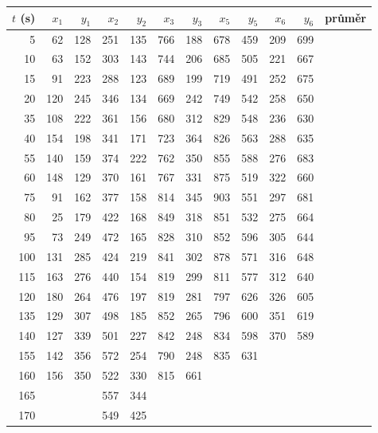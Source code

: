 \documentclass[a4paper,11pt]{article}
\begin{document}
\begin{table}[htpb]
    \centering
    \scriptsize
    \begin{tabular}{c | r r | r r | r r | r r | r r | c}
        \multicolumn{1}{r|}{$ t $ (s)} & $ x_1 $ & $ y_1 $ & $ x_2 $ & $ y_2 $ & $ x_3 $ & $ y_3 $ & $ x_5 $ & $ y_5 $ & $ x_6 $ & $ y_6 $ & průměr  \\
        \hline\hline
       \multicolumn{1}{r|}{  5} & 62  & 128 & 251 & 135 & 766 & 188 & 678 & 459 & 209 & 699 &  \\
       \multicolumn{1}{r|}{ 10} & 63  & 152 & 303 & 143 & 744 & 206 & 685 & 505 & 221 & 667 &  \\
       \multicolumn{1}{r|}{ 15} & 91  & 223 & 288 & 123 & 689 & 199 & 719 & 491 & 252 & 675 &  \\
       \multicolumn{1}{r|}{ 20} & 120 & 245 & 346 & 134 & 669 & 242 & 749 & 542 & 258 & 650 &  \\
       \multicolumn{1}{r|}{ 35} & 108 & 222 & 361 & 156 & 680 & 312 & 829 & 548 & 236 & 630 &  \\
       \multicolumn{1}{r|}{ 40} & 154 & 198 & 341 & 171 & 723 & 364 & 826 & 563 & 288 & 635 &  \\
       \multicolumn{1}{r|}{ 55} & 140 & 159 & 374 & 222 & 762 & 350 & 855 & 588 & 276 & 683 &  \\
       \multicolumn{1}{r|}{ 60} & 148 & 129 & 370 & 161 & 767 & 331 & 875 & 519 & 322 & 660 &  \\
       \multicolumn{1}{r|}{ 75} & 91  & 162 & 377 & 158 & 814 & 345 & 903 & 551 & 297 & 681 &  \\
       \multicolumn{1}{r|}{ 80} & 25  & 179 & 422 & 168 & 849 & 318 & 851 & 532 & 275 & 664 &  \\
       \multicolumn{1}{r|}{ 95} & 73  & 249 & 472 & 165 & 828 & 310 & 852 & 596 & 305 & 644 &  \\
       \multicolumn{1}{r|}{100} & 131 & 285 & 424 & 219 & 841 & 302 & 878 & 571 & 316 & 648 &  \\
       \multicolumn{1}{r|}{115} & 163 & 276 & 440 & 154 & 819 & 299 & 811 & 577 & 312 & 640 &  \\
       \multicolumn{1}{r|}{120} & 180 & 264 & 476 & 197 & 819 & 281 & 797 & 626 & 326 & 605 &  \\
       \multicolumn{1}{r|}{135} & 129 & 307 & 498 & 185 & 852 & 265 & 796 & 600 & 351 & 619 &  \\
       \multicolumn{1}{r|}{140} & 127 & 339 & 501 & 227 & 842 & 248 & 834 & 598 & 370 & 589 &  \\
       \multicolumn{1}{r|}{155} & 142 & 356 & 572 & 254 & 790 & 248 & 835 & 631 &     &     &  \\
       \multicolumn{1}{r|}{160} & 156 & 350 & 522 & 330 & 815 & 661 &     &     &     &     &  \\
       \multicolumn{1}{r|}{165} &     &     & 557 & 344 &     &     &     &     &     &     &  \\
       \multicolumn{1}{r|}{170} &     &     & 549 & 425 &     &     &     &     &     &     &  \\\hline\hline


\end{tabular}
\end{table}
\end{document}
